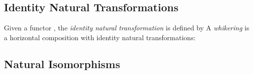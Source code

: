 \subsection{Identity Natural Transformations}

Given a functor
, the \textit{identity natural transformation}
is defined by
A \textit{whikering} is a horizontal composition with identity natural transformations:


\subsection{Natural Isomorphisms}

